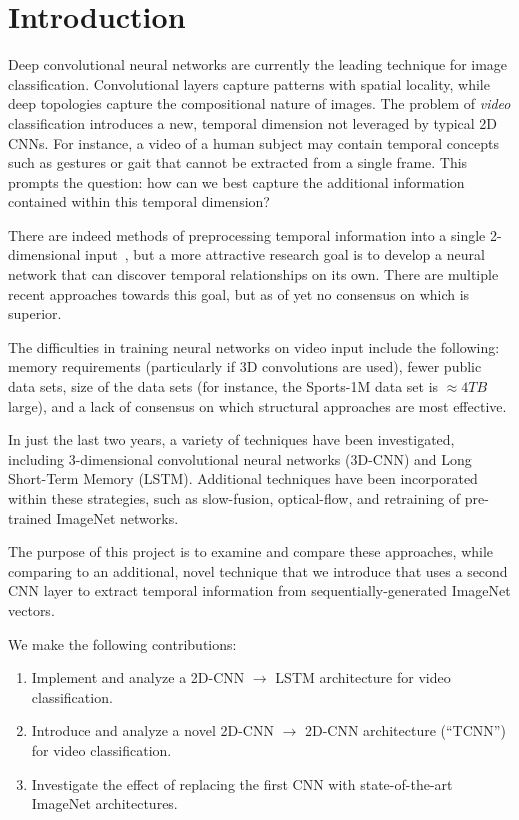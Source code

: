 \section{Introduction}
Deep convolutional neural networks are currently the leading technique for image classification.
Convolutional layers capture patterns with spatial locality, while deep topologies capture the compositional nature of images.
The problem of \emph{video} classification introduces a new, temporal dimension not leveraged by typical 2D CNNs. For instance, a video of a human subject may contain temporal concepts such as gestures or gait that cannot be extracted from a single frame. This prompts the question:
 how can we best capture the additional information contained within this temporal dimension?   

There are indeed methods of preprocessing temporal information into a single 2-dimensional input~\cite{brox}, but a more attractive research goal is to develop a neural network that can discover temporal relationships on its own.
There are multiple recent approaches towards this goal, but as of yet no consensus on which is superior.

The difficulties in training neural networks on video input include the following: memory requirements (particularly if 3D convolutions are used), fewer public data sets, size of the data sets (for instance, the Sports-1M data set is $\approx 4TB$ large), and a lack of consensus on which structural approaches are most effective.

In just the last two years, a variety of techniques have been investigated, including 3-dimensional convolutional neural networks (3D-CNN) and Long Short-Term Memory (LSTM). Additional techniques have been incorporated within these strategies, such as slow-fusion, optical-flow, and retraining of pre-trained ImageNet networks.

The purpose of this project is to examine and compare these approaches, while comparing to an additional, novel technique that we introduce that uses a second CNN layer to extract temporal information from sequentially-generated ImageNet vectors. 

We make the following contributions:
\begin{enumerate}
\item Implement and analyze a 2D-CNN $\to$ LSTM architecture for video classification.
\item Introduce and analyze a novel 2D-CNN $\to$ 2D-CNN architecture (``TCNN'') for video classification. 
\item Investigate the effect of replacing the first CNN with state-of-the-art ImageNet architectures.
\end{enumerate}

